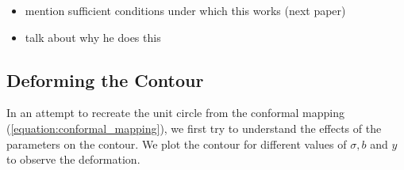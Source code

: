 \documentclass[a4paper]{report}
\begin{document}

\begin{itemize}
    \item mention sufficient conditions under which this works (next paper)
    \item talk about why he does this
\end{itemize}

\subsection{Deforming the Contour}
In an attempt to recreate the unit circle from the conformal mapping (\ref{equation:conformal_mapping}), we first try to understand the effects of the parameters on the contour. We plot the contour for different values of $\sigma, b$ and $y$ to observe the deformation.
\end{document}
